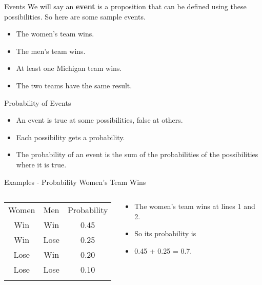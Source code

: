 \documentclass[
  ignorenonframetext,
]{beamer}
\providecommand{\tightlist}{%
  \setlength{\itemsep}{0pt}\setlength{\parskip}{0pt}}
\renewcommand{\,}{\text{, }}
\begin{document}
\begin{frame}{Events}
\protect\hypertarget{events}{}
We will say an \textbf{event} is a proposition that can be defined using
these possibilities. So here are some sample events.

\begin{itemize}
\tightlist
\item
  The women's team wins.
\item
  The men's team wins.
\item
  At least one Michigan team wins.
\item
  The two teams have the same result.
\end{itemize}
\end{frame}

\begin{frame}{Probability of Events}
\protect\hypertarget{probability-of-events}{}
\begin{itemize}
\tightlist
\item
  An event is true at some possibilities, false at others.
\item
  Each possibility gets a probability.
\item
  The probability of an event is the sum of the probabilities of the
  possibilities where it is true.
\end{itemize}
\end{frame}

\begin{frame}{Examples - Probability Women's Team Wins}
\protect\hypertarget{examples---probability-womens-team-wins}{}
\begin{columns}[T]
\begin{column}{0.48\textwidth}
\begin{longtable}[]{@{}ccc@{}}
\toprule
Women & Men & Probability \\ \addlinespace
\midrule
\endhead
Win & Win & 0.45 \\ \addlinespace
Win & Lose & 0.25 \\ \addlinespace
Lose & Win & 0.20 \\ \addlinespace
Lose & Lose & 0.10 \\ \addlinespace
\bottomrule
\end{longtable}
\end{column}

\begin{column}{0.48\textwidth}
\bigskip

\begin{itemize}
\tightlist
\item
  The women's team wins at lines 1 and 2.
\item
  So its probability is
\item
  0.45 + 0.25 = 0.7.
\end{itemize}
\end{column}
\end{columns}
\end{frame}
\end{document}
